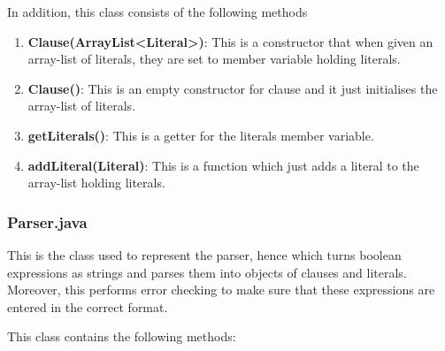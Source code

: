\documentclass{article}
\begin{document}
		In addition, this class consists of the following methods
		
		\begin{enumerate}
		\item \textbf{Clause(ArrayList\textless Literal\textgreater)}: This is a constructor that when given an array-list of literals, they are set to member variable holding literals.
		
		\item \textbf{Clause()}: This is an empty constructor for clause and it just initialises the array-list of literals.
		\item \textbf{getLiterals()}: This is a getter for the literals member variable.		
		\item \textbf{addLiteral(Literal)}: This is a function which just adds a literal to the array-list holding literals.
		
		
		\end{enumerate}
		
		\subsubsection{Parser.java}
		
		This is the class used to represent the parser, hence which turns boolean expressions as strings and parses them into objects of clauses and literals. Moreover, this performs error checking to make sure that these expressions are entered in the correct format. 
		
		This class contains the following methods:
		
\end{document}
